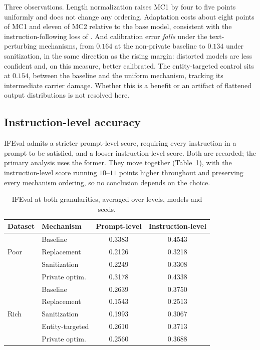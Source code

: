 Three observations.
Length normalization raises MC1 by four to five points uniformly and does not change any ordering.
Adaptation costs about eight points of MC1 and eleven of MC2 relative to the base model,
consistent with the instruction-following loss of .
And calibration error \textit{falls} under the text-perturbing mechanisms,
from $0.164$ at the non-private baseline to $0.134$ under sanitization,
in the same direction as the rising margin:
distorted models are less confident and,
on this measure,
better calibrated.
The entity-targeted control sits at $0.154$,
between the baseline and the uniform mechanism,
tracking its intermediate carrier damage.
Whether this is a benefit or an artifact of flattened output distributions is not resolved here.

\subsection{Instruction-level accuracy}
IFEval admits a stricter prompt-level score,
requiring every instruction in a prompt to be satisfied,
and a looser instruction-level score.
Both are recorded;
the primary analysis uses the former.
They move together (Table~\ref{tab:ifevallevels}),
with the instruction-level score running $10$--$11$ points higher throughout and preserving every mechanism ordering,
so no conclusion depends on the choice.

\begin{table}[t]
  \centering
  \caption{IFEval at both granularities,
  averaged over levels,
  models and seeds.}
  \label{tab:ifevallevels}
  \begin{tabular}{llcc}
    \toprule
    Dataset & Mechanism & Prompt-level & Instruction-level \\
    \midrule
    \multirow{3}{*}{Poor}
      & Baseline       & 0.3383 & 0.4543 \\
      & Replacement    & 0.2126 & 0.3218 \\
      & Sanitization   & 0.2249 & 0.3308 \\
      & Private optim. & 0.3178 & 0.4338 \\
    \midrule
    \multirow{5}{*}{Rich}
      & Baseline       & 0.2639 & 0.3750 \\
      & Replacement    & 0.1543 & 0.2513 \\
      & Sanitization   & 0.1993 & 0.3067 \\
      & Entity-targeted& 0.2610 & 0.3713 \\
      & Private optim. & 0.2560 & 0.3688 \\
    \bottomrule
  \end{tabular}
\end{table}

